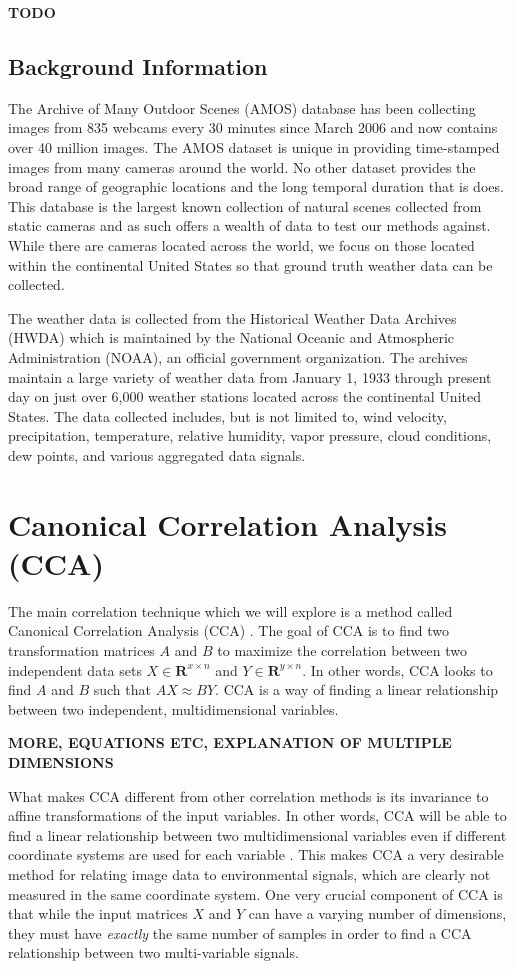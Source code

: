 \textbf{TODO}

\section{Background Information}
The Archive of Many Outdoor Scenes (AMOS) database \cite{jacobs07amos} has been collecting images from 835 webcams every 30 minutes since March 2006 and now contains over 40 million images. The AMOS dataset is unique in providing time-stamped images from many cameras around the world. No other dataset provides the broad range of geographic locations and the long temporal duration that is does. This database is the largest known collection of natural scenes collected from static cameras and as such offers a wealth of data to test our methods against. While there are cameras located across the world, we focus on those located within the continental United States so that ground truth weather data can be collected.

The weather data is collected from the Historical Weather Data Archives (HWDA) \cite{noaa} which is maintained by the National Oceanic and Atmospheric Administration (NOAA), an official government organization. The archives maintain a large variety of weather data from January 1, 1933 through present day on just over 6,000 weather stations located across the continental United States. The data collected includes, but is not limited to, wind velocity, precipitation, temperature, relative humidity, vapor pressure, cloud conditions, dew points, and various aggregated data signals.

\chapter{Canonical Correlation Analysis (CCA)}
\label{cpt:cca}
The main correlation technique which we will explore is a method called Canonical Correlation Analysis (CCA) \cite{hotelling}. The goal of CCA is to find two transformation matrices $A$ and $B$ to maximize the correlation between two independent data sets $X \in \mathbf{R}^{x\times n}$ and $Y \in \mathbf{R}^{y\times n}$. In other words, CCA looks to find $A$ and $B$ such that $AX\approx BY$. CCA is a way of finding a linear relationship between two independent, multidimensional variables.

\textbf{MORE, EQUATIONS ETC, EXPLANATION OF MULTIPLE DIMENSIONS}

What makes CCA different from other correlation methods is its invariance to affine transformations of the input variables. In other words, CCA will be able to find a linear relationship between two multidimensional variables even if different coordinate systems are used for each variable \cite{bkl97}. This makes CCA a very desirable method for relating image data to environmental signals, which are clearly not measured in the same coordinate system. One very crucial component of CCA is that while the input matrices $X$ and $Y$ can have a varying number of dimensions, they must have \textit{exactly} the same number of samples in order to find a CCA relationship between two multi-variable signals.

